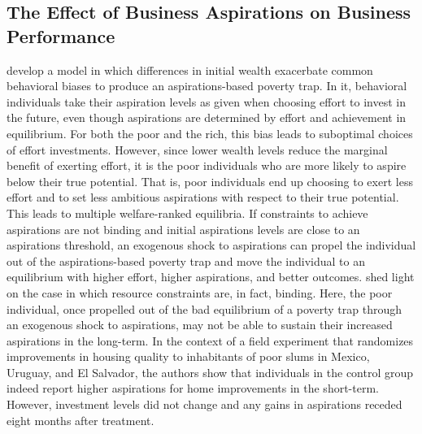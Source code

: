 \documentclass[11.5pt]{article}
\begin{document}
\subsection{The Effect of Business Aspirations on Business Performance}

\citet{Dalton2016} develop a model in which differences in initial wealth exacerbate common behavioral biases to produce an aspirations-based poverty trap. In it, behavioral individuals take their aspiration levels as given when choosing effort to invest in the future, even though aspirations are determined by effort and achievement in equilibrium. For both the poor and the rich, this bias leads to suboptimal choices of effort investments. However, since lower wealth levels reduce the marginal benefit of exerting effort, it is the poor individuals who are more likely to aspire below their true potential. That is, poor individuals end up choosing to exert less effort and to set less ambitious aspirations with respect to their true potential. This leads to multiple welfare-ranked equilibria. If constraints to achieve aspirations are not binding and initial aspirations levels are close to an aspirations threshold, an exogenous shock to aspirations can propel the individual out of the aspirations-based poverty trap and move the individual to an equilibrium with higher effort, higher aspirations, and better outcomes. \citet{Galiani2018} shed light on the case in which resource constraints are, in fact, binding. Here, the poor individual, once propelled out of the bad equilibrium of a poverty trap through an exogenous shock to aspirations, may not be able to sustain their increased aspirations in the long-term. In the context of a field experiment that randomizes improvements in housing quality to inhabitants of poor slums in Mexico, Uruguay, and El Salvador, the authors show that individuals in the control group indeed report higher aspirations for home improvements in the short-term. However, investment levels did not change and any gains in aspirations receded eight months after treatment.
\end{document}
